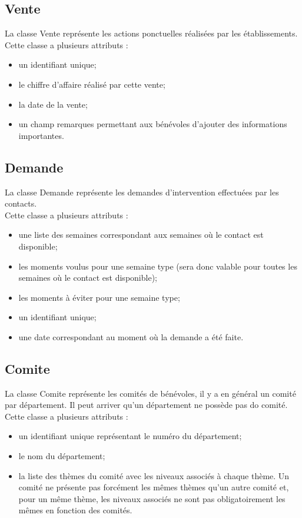 \documentclass[asi, sansVersion]{picInsa}
\begin{document}
\subsection*{Vente}
La classe Vente représente les actions ponctuelles réalisées par les établissements.\\ 
Cette classe a plusieurs attributs : 
\begin{itemize}
\item un identifiant unique; 
\item le chiffre d'affaire réalisé par cette vente;
\item la date de la vente;
\item un champ remarques permettant aux bénévoles d'ajouter des informations importantes. 
\end{itemize}

\subsection*{Demande}

La classe Demande représente les demandes d'intervention effectuées par les contacts.\\
Cette classe a plusieurs attributs :
\begin{itemize}
\item une liste des semaines correspondant aux semaines où le contact est disponible; 
\item les moments voulus pour une semaine type (sera donc valable pour toutes les semaines où le contact est disponible);
\item les moments à éviter pour une semaine type;
\item un identifiant unique;
\item une date correspondant au moment où la demande a été faite.
\end{itemize}

\subsection*{Comite}

La classe Comite représente les comités de bénévoles, il y a en général un comité par département. Il peut arriver qu'un département ne possède pas do comité.\\
Cette classe a plusieurs attributs :
\begin{itemize}
\item un identifiant unique représentant le numéro du département;
\item le nom du département;
\item la liste des thèmes du comité avec les niveaux associés à chaque thème. Un comité ne présente pas forcément les mêmes thèmes qu'un autre comité et, pour un même thème, les niveaux associés ne sont pas obligatoirement les mêmes en fonction des comités. 
\end{itemize}
\end{document}
